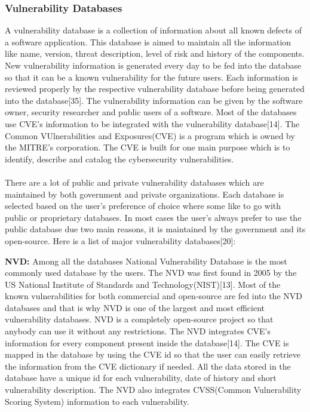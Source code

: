 \subsubsection{Vulnerability Databases}
A vulnerability database is a collection of information about all known defects of a software application. This database is aimed to maintain all the information like name, version, threat description, level of risk and history of the components. New vulnerability information is generated every day to be fed into the database so that it can be a known vulnerability for the future users. Each information is reviewed properly by the respective vulnerability database before being generated into the database[35]. The vulnerability information can be given by the software owner, security researcher and public users of a software. Most of the databases use \acs{CVE}’s information to be integrated with the vulnerability database[14]. The Common VUlnerabilities and Exposures(\acs{CVE}) is a program which is owned by the MITRE’s corporation. The \acs{CVE} is built for one main purpose which is to identify, describe and catalog the cybersecurity vulnerabilities.
\paragraph{}
There are a lot of public and private vulnerability databases which are maintained by both government and private organizations. Each database is selected based on the user's preference of choice where some like to go with public or proprietary databases. In most cases the user’s always prefer to use the public database due two main reasons, it is maintained by the government and its open-source. Here is a list of major vulnerability databases[20]:

{\bf NVD:} Among all the databases National Vulnerability Database is the most commonly used database by the users. The NVD was first found in 2005 by the US National Institute of Standards and Technology(NIST)[13]. Most of the known vulnerabilities for both commercial and open-source are fed into the NVD databases and that is why NVD is one of the largest and most efficient vulnerability databases. NVD is a completely open-source project so that anybody can use it without any restrictions. The NVD integrates CVE’s information for every component present inside the database[14]. The CVE is mapped in the database by using the CVE id so that the user can easily retrieve the information from the CVE dictionary if needed. All the data stored in the database have a unique id for each vulnerability, date of history and short vulnerability description. The NVD also integrates CVSS(Common Vulnerability Scoring System) information to each vulnerability.
